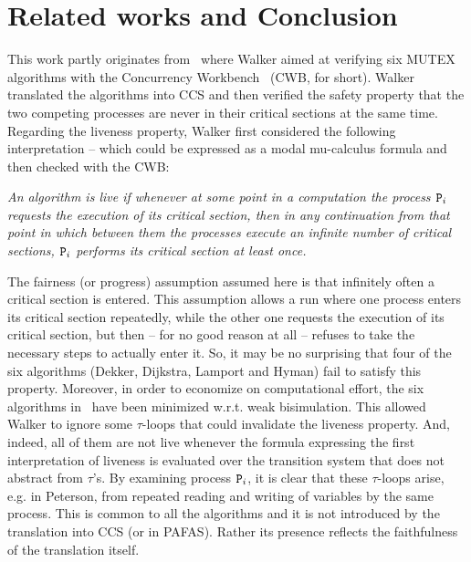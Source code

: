 \documentclass[copyright,creativecommons]{eptcs}
\newcommand{\proc}{{\tt P}}
\begin{document}
\section{Related works and Conclusion} \label{sec:walker}
This work partly originates from~\cite{Walker89} where Walker aimed at
verifying six MUTEX algorithms with the Concurrency
Workbench~\cite{CleavelandPS89} (CWB, for short). 
Walker translated the algorithms into CCS and then verified the safety
property that the two competing processes are never in their critical
sections at the same time. Regarding the liveness property, Walker first
considered the following interpretation -- which could be expressed as a
modal mu-calculus formula and then checked with the CWB:
\begin{center}
\begin{minipage}{15.5cm}
\small
\em
An algorithm is live if whenever at some point in a computation the
process $\proc_i$ requests the execution of its critical section, then in
any continuation from that point in which between them the processes
execute an infinite number of critical sections, $\proc_i$ performs its
critical section at least once. 
\end{minipage}
\end{center}
The fairness (or progress) assumption assumed here is that infinitely often
a critical section is entered. This assumption allows a run where one
process enters its critical section repeatedly, while the other one
requests the execution of its critical section, but then -- for no good
reason at all -- refuses to take the necessary steps to actually enter it.
So, it may be no surprising that four of the six algorithms (Dekker,
Dijkstra, Lamport and Hyman) fail to satisfy this property. Moreover, in
order to economize on computational effort, the six algorithms
in~\cite{Walker89} have been minimized w.r.t. weak bisimulation. This
allowed Walker to ignore some $\tau$-loops that could invalidate the
liveness property. And, indeed, all of them are not live whenever
the formula expressing the first interpretation of liveness is evaluated
over the transition system that does not abstract from $\tau$'s. By
examining process $\proc_i$, it is clear that these $\tau$-loops arise,
e.g. in Peterson, from repeated reading and writing of variables by the
same process. This is common to all the algorithms and it is not introduced
by the translation into CCS (or in PAFAS). Rather its presence reflects the
faithfulness of the translation itself. 
\end{document}
